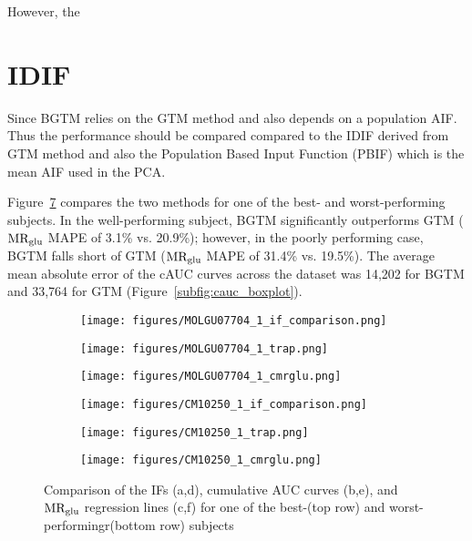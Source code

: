 However, the 



\section{IDIF}

Since BGTM relies on the GTM method and also depends on a population AIF. Thus the performance should be compared compared to the IDIF derived from GTM method and also the Population Based Input Function (PBIF) which is the mean AIF used in the PCA.


Figure~\ref{fig:ifs} compares the two methods for one of the best- and worst-performing subjects.
In the well-performing subject, BGTM significantly outperforms GTM ($\text{MR}_{\text{glu}}$ MAPE of 3.1\% vs. 20.9\%); however, in the poorly performing case, BGTM falls short of GTM ($\text{MR}_{\text{glu}}$ MAPE of 31.4\% vs. 19.5\%).
The average mean absolute error of the cAUC curves across the dataset was 14,202 for BGTM and 33,764 for GTM (Figure~\ref{subfig:cauc_boxplot}).

\begin{figure}[h]
	\centering
	\begin{subfigure}[b]{0.322\textwidth}
		\texttt{[image: figures/MOLGU07704\_1\_if\_comparison.png]}
		\caption{}
		\label{subfig:good_if_compare}
	\end{subfigure}
	\begin{subfigure}[b]{0.322\textwidth}
		\texttt{[image: figures/MOLGU07704\_1\_trap.png]}
		\caption{}
		\label{subfig:good_trap_compare}
	\end{subfigure}
	\begin{subfigure}[b]{0.322\textwidth}
		\texttt{[image: figures/MOLGU07704\_1\_cmrglu.png]}
		\caption{}
		\label{fig:good_cmrglu}
	\end{subfigure}
	\begin{subfigure}[b]{0.322\textwidth}
		\texttt{[image: figures/CM10250\_1\_if\_comparison.png]}
		\caption{}
		\label{subfig:bad_if_compare}
	\end{subfigure}
	\begin{subfigure}[b]{0.322\textwidth}
		\texttt{[image: figures/CM10250\_1\_trap.png]}
		\caption{}
		\label{subfig:bad_trap_compare}
	\end{subfigure}
	\begin{subfigure}[b]{0.322\textwidth}
		\texttt{[image: figures/CM10250\_1\_cmrglu.png]}
		\caption{}
		\label{fig:bad_cmrglu}
	\end{subfigure}
	\caption{Comparison of the IFs (a,d), cumulative AUC curves (b,e), and $\text{MR}_{\text{glu}}$ regression lines (c,f) for one of the best-(top row) and worst-performingr(bottom row) subjects}
	\label{fig:ifs}
\end{figure}

